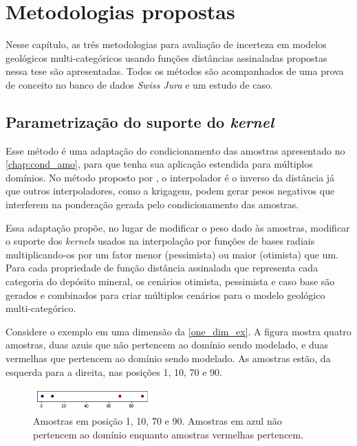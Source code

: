 \chapter{Metodologias propostas}\label{chap3}

Nesse capítulo, as três metodologias para avaliação de incerteza em modelos geológicos multi-categóricos usando funções distâncias assinaladas propostas nessa tese são apresentadas. Todos os métodos são acompanhados de uma prova de conceito no banco de dados \textit{Swiss Jura} e um estudo de caso. 

\section{Parametrização do suporte do \textit{kernel}}\label{kernel_fac}

Esse método é uma adaptação do condicionamento das amostras apresentado no \autoref{chap:cond_amo}, para que tenha sua aplicação estendida para múltiplos domínios. No método proposto por , o interpolador é o inverso da distância já que outros interpoladores, como a krigagem, podem gerar pesos negativos que interferem na ponderação gerada pelo condicionamento das amostras.

Essa adaptação propõe, no lugar de modificar o peso dado às amostras, modificar o suporte dos \textit{kernels} usados na interpolação por funções de bases radiais multiplicando-os por um fator menor (pessimista) ou maior (otimista) que um. Para cada propriedade de função distância assinalada que representa cada categoria do depósito mineral, os cenários otimista, pessimista e caso base são gerados e combinados para criar múltiplos cenários para o modelo geológico multi-categórico.

Considere o exemplo em uma dimensão da \autoref{one_dim_ex}. A figura mostra quatro amostras, duas azuis que não pertencem ao domínio sendo modelado, e duas vermelhas que pertencem ao domínio sendo modelado. As amostras estão, da esquerda para a direita, nas posições 1, 10, 70 e 90.

\begin{figure}[H]
	\caption{\label{one_dim_ex} Amostras em posição 1, 10, 70 e 90. Amostras em azul não pertencem ao domínio enquanto amostras vermelhas pertencem.}
	\centering
		\includegraphics[width=0.4\textwidth]{capitulo_3/imagens/pointssd.png}
\end{figure}

